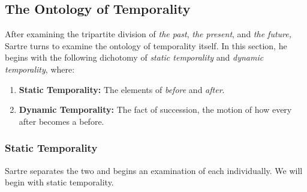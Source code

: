\subsection{The Ontology of Temporality}

After examining the tripartite division of \emph{the past}, \emph{the present}, and \emph{the future,} Sartre turns to examine the ontology of temporality itself. In this section, he begins with the following dichotomy of \emph{static temporality} and \emph{dynamic temporality}, where:

\begin{enumerate}
    \item \textbf{Static Temporality:} The elements of \emph{before} and \emph{after}.


    \item \textbf{Dynamic Temporality:} The fact of succession, the motion of how every after becomes a before.

\end{enumerate}

\subsubsection*{Static Temporality}
Sartre separates the two and begins an examination of each individually. We will begin with static temporality.

